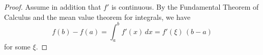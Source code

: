 

\begin{proof} Assume in addition that $f'$ is continuous.
By the Fundamental Theorem of Calculus and the mean value theorem 
for integrals, we have 
$$
f(b)-f(a) = \int_a^b f'(x)\,dx = f'(\xi)\,(b-a)
$$
for some $\xi$.

\end{proof}


